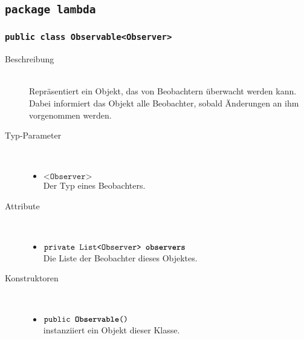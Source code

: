 \subsection{\texttt{package lambda}}

\subsubsection{\normalfont \texttt{public class \textbf{Observable}<Observer>}}

\begin{description}
\item[Beschreibung] \hfill \\ Repräsentiert ein Objekt, das von Beobachtern überwacht werden kann. Dabei informiert das Objekt alle Beobachter, sobald Änderungen an ihm vorgenommen werden.

\item[Typ-Parameter] \hfill \\
	\vspace{-.8cm}
	\begin{itemize}
		\item $\texttt{<Observer>}$ \\ Der Typ eines Beobachters.
	\end{itemize}

\item[Attribute] \hfill \\
	\vspace{-.8cm}
	\begin{itemize}
		\item $\texttt{private List<Observer> \textbf{observers}}$ \\ Die Liste der Beobachter dieses Objektes.
	\end{itemize}
	
\item[Konstruktoren] \hfill \\
	\vspace{-.8cm}
	\begin{itemize}
		\item $\texttt{public \textbf{Observable}()}$ \\ instanziiert ein Objekt dieser Klasse.
	\end{itemize}
	

\end{description}
